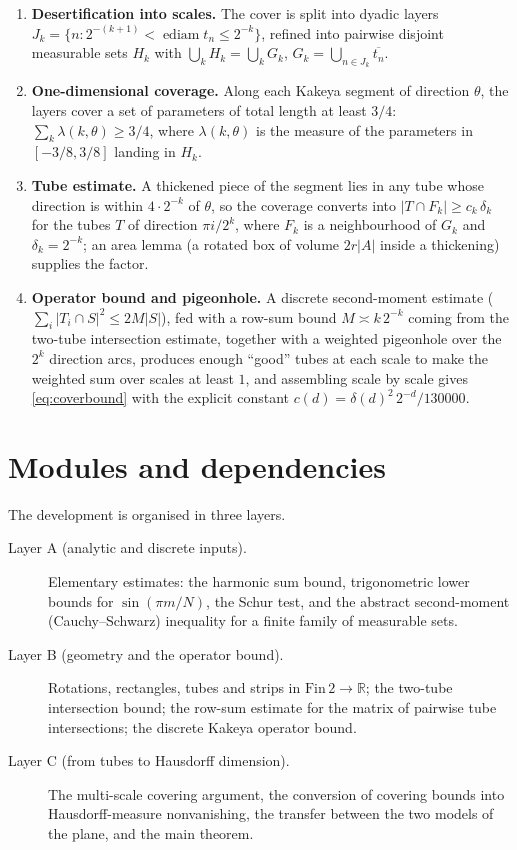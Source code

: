 \documentclass[11pt,a4paper]{article}
\newcommand{\R}{\mathbb{R}}
\DeclareMathOperator{\ediam}{ediam}
\newcommand{\FinTwo}{\ensuremath{\mathrm{Fin}\,2 \to \R}}
\theoremstyle{definition}
\theoremstyle{remark}
\begin{document}
\begin{enumerate}
\item \textbf{Desertification into scales.}  The cover is split into dyadic layers
  $J_k = \{n : 2^{-(k+1)}<\ediam t_n\le 2^{-k}\}$, refined into pairwise disjoint
  measurable sets $H_k$ with $\bigcup_k H_k = \bigcup_k G_k$,
  $G_k=\bigcup_{n\in J_k}\overline{t_n}$.
\item \textbf{One-dimensional coverage.}  Along each Kakeya segment of direction $\theta$,
  the layers cover a set of parameters of total length at least $3/4$:
  $\sum_k \lambda(k,\theta)\ge 3/4$, where $\lambda(k,\theta)$ is the measure of the
  parameters in $[-3/8,3/8]$ landing in $H_k$.
\item \textbf{Tube estimate.}  A thickened piece of the segment lies in any tube whose
  direction is within $4\cdot 2^{-k}$ of $\theta$, so the coverage converts into
  $|T\cap F_k|\ge c_k\,\delta_k$ for the tubes $T$ of direction $\pi i/2^k$, where
  $F_k$ is a neighbourhood of $G_k$ and $\delta_k=2^{-k}$; an area lemma
  (a rotated box of volume $2r|A|$ inside a thickening) supplies the factor.
\item \textbf{Operator bound and pigeonhole.}  A discrete second-moment estimate
  ($\sum_i |T_i\cap S|^2\le 2M|S|$), fed with a row-sum bound
  $M\asymp k\,2^{-k}$ coming from the two-tube intersection estimate, together with a
  weighted pigeonhole over the $2^k$ direction arcs, produces enough ``good'' tubes at
  each scale to make the weighted sum over scales at least $1$, and assembling scale by
  scale gives \eqref{eq:coverbound} with the explicit constant
  $c(d)=\delta(d)^{2}\,2^{-d}/130000$.
\end{enumerate}

\section{Modules and dependencies}

The development is organised in three layers.

\begin{description}
\item[Layer A (analytic and discrete inputs).]  Elementary estimates: the harmonic sum
  bound, trigonometric lower bounds for $\sin(\pi m/N)$, the Schur test, and the abstract
  second-moment (Cauchy--Schwarz) inequality for a finite family of measurable sets.
\item[Layer B (geometry and the operator bound).]  Rotations, rectangles, tubes and strips
  in $\FinTwo$; the two-tube intersection bound; the row-sum estimate for the matrix of
  pairwise tube intersections; the discrete Kakeya operator bound.
\item[Layer C (from tubes to Hausdorff dimension).]  The multi-scale covering argument,
  the conversion of covering bounds into Hausdorff-measure nonvanishing, the transfer
  between the two models of the plane, and the main theorem.
\end{description}
\end{document}

